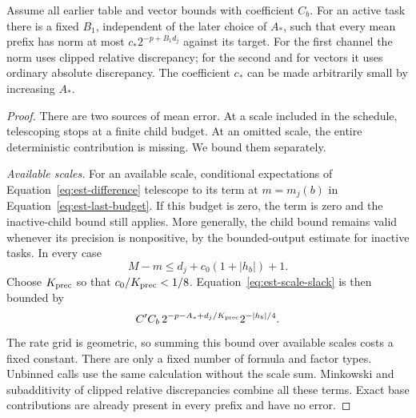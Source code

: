 \begin{lemma}\label{lem:est-mean-prefix}
Assume all earlier table and vector bounds with coefficient $C_b$.
For an active task there is a fixed $B_1$, independent of the later
choice of $A_*$, such that every mean prefix has norm at most
$c_*2^{-p+B_1d_j}$ against its target.  For the first channel the norm
uses clipped relative discrepancy; for the second and for vectors it uses
ordinary absolute discrepancy.  The coefficient $c_*$ can be made
arbitrarily small by increasing $A_*$.
\end{lemma}
\begin{proof}
There are two sources of mean error. At a scale included in the schedule, telescoping stops at a finite child budget. At an omitted scale, the entire deterministic contribution is missing. We bound them separately.

\emph{Available scales.}  For an available scale, conditional expectations of
Equation~\eqref{eq:est-difference} telescope to its term at
$m=m_j(b)$ in Equation~\eqref{eq:est-last-budget}.  If this budget is
zero, the term is zero and the inactive-child bound still applies.
More generally, the child bound remains valid whenever its precision is
nonpositive, by the bounded-output estimate for inactive tasks.
In every case
\[
 M-m\le d_j+c_0(1+|h_b|)+1.
\]
Choose $K_{\rm prec}$ so that $c_0/K_{\rm prec}<1/8$.
Equation~\eqref{eq:est-scale-slack} is then bounded by
\[
 C' C_b\,2^{-p-A_*+d_j/K_{\rm prec}}2^{-|h_b|/4}.
\]
The rate grid is geometric, so summing this bound over available scales
costs a fixed constant.  There are only a fixed number of formula and
factor types.  Unbinned calls use the same calculation without the scale
sum.  Minkowski and subadditivity of clipped relative discrepancies
combine all these terms.  Exact base contributions are already present
in every prefix and have no error.


\end{proof}
